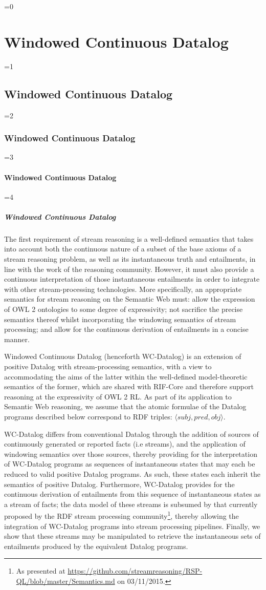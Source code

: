 \documentclass[twocolumn,preprint,3p,number]{elsarticle}
\theoremstyle{plain}
\theoremstyle{definition}
\newcounter{nestingdepth}
\newenvironment{nestedsection}[2]{
  \ifnum\value{nestingdepth}=0
    \chapter{#1}
  \else
    \ifnum\value{nestingdepth}=1
      \section{#1}
    \else
      \ifnum\value{nestingdepth}=2
        \subsection{#1}
      \else
        \ifnum\value{nestingdepth}=3
          \subsubsection{#1}
        \else
          \ifnum\value{nestingdepth}=4
            \paragraph{#1}
          \else
            \PackageError{nestedsections}{Maximum nesting level exceeded!}{uh oh!}
          \fi
        \fi
      \fi
    \fi
  \fi
  \addtocounter{nestingdepth}{1}
  \label{sec:#2}
}{\addtocounter{nestingdepth}{-1}}
\begin{document}
\begin{nestedsection}{Windowed Continuous Datalog}{semantics}
The first requirement of stream reasoning is a well-defined semantics
that takes into account both the continuous nature of a subset of the
base axioms of a stream reasoning problem, as well as its
instantaneous truth and entailments, in line with the work of the
reasoning community.  However, it must also provide a continuous
interpretation of those instantaneous entailments in order to
integrate with other stream-processing technologies.  More
specifically, an appropriate semantics for stream reasoning on the
Semantic Web must: allow the expression of OWL 2 ontologies to some
degree of expressivity; not sacrifice the precise semantics thereof
whilst incorporating the windowing semantics of stream processing; and allow for
the continuous derivation of entailments in a concise manner.

Windowed Continuous Datalog (henceforth WC-Datalog) is an extension of positive
Datalog with stream-processing semantics, with a view to accommodating
the aims of the latter within the well-defined model-theoretic
semantics of the former, which are shared with RIF-Core
\cite{w3crifbld} and therefore support reasoning at the expressivity
of OWL 2 RL. As part of its application to Semantic Web reasoning, we
assume that the atomic formulae of the Datalog programs described
below correspond to RDF triples: $\langle subj, pred, obj\rangle$.

WC-Datalog differs from conventional Datalog through the addition of
sources of continuously generated or reported facts (i.e streams), and
the application of windowing semantics over those sources,
thereby providing for the interpretation of WC-Datalog programs as
sequences of instantaneous states that may each be reduced to valid positive Datalog
programs.  As such, these states each inherit the semantics of
positive Datalog.  Furthermore, WC-Datalog provides for the continuous derivation
of entailments from this sequence of instantaneous states as a stream
of facts; the data model of these streams is subsumed by that currently proposed
by the RDF stream processing community\footnote{As presented at
\url{https://github.com/streamreasoning/RSP-QL/blob/master/Semantics.md}
on \mbox{03/11/2015}.}, thereby allowing the integration of WC-Datalog programs
into stream processing pipelines. Finally, we show that these streams may be
manipulated to retrieve the instantaneous sets of entailments produced
by the equivalent Datalog programs.


\end{nestedsection}
\end{document}
